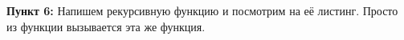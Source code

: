 \documentclass[a4paper,12pt]{article}
\begin{document}
\textbf{Пункт 6:}
Напишем рекурсивную функцию и посмотрим на её листинг. Просто из функции вызывается эта же функция.  
\begin{figure}[H]\label{fig: 6C32 and 6Cpp64}
\end{figure}
\end{document}

